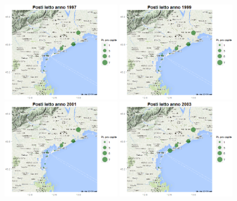 \documentclass[a4paper,11pt,twoside,openright]{book}							%
\begin{document}
\newpage
\begin{figure}[H]
	\centering
	\includegraphics[trim=0cm 0cm 0cm 0cm,clip=true,width=0.45\textwidth]{Immagini/venezia_dati/PL1997.png}
	\includegraphics[trim=0cm 0cm 0cm 0cm,clip=true,width=0.45\textwidth]{Immagini/venezia_dati/PL1999.png}
	\includegraphics[trim=0cm 0cm 0cm 0cm,clip=true,width=0.45\textwidth]{Immagini/venezia_dati/PL2001.png}
	\includegraphics[trim=0cm 0cm 0cm 0cm,clip=true,width=0.45\textwidth]{Immagini/venezia_dati/PL2003.png}

\end{figure}
\end{document}
